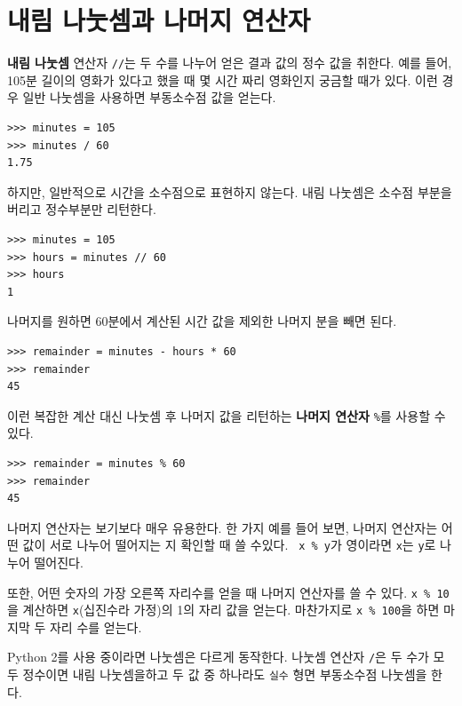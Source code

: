 \documentclass[10pt]{book}
\begin{document}
\section{내림 나눗셈과 나머지 연산자}

{\bf 내림 나눗셈} 연산자 \verb"//"는 두 수를 나누어 얻은 결과 값의 정수
값을 취한다.  예를 들어, 105분 길이의 영화가 있다고 했을 때 몇 시간
짜리 영화인지 궁금할 때가 있다.  이런 경우 일반 나눗셈을 사용하면
부동소수점 값을 얻는다.

\begin{verbatim}
>>> minutes = 105
>>> minutes / 60
1.75
\end{verbatim}

하지만, 일반적으로 시간을 소수점으로 표현하지 않는다. 내림 나눗셈은
소수점 부분을 버리고 정수부분만 리턴한다.


\begin{verbatim}
>>> minutes = 105
>>> hours = minutes // 60
>>> hours
1
\end{verbatim}

나머지를 원하면 60분에서 계산된 시간 값을 제외한 나머지 분을 빼면 된다. 

\begin{verbatim}
>>> remainder = minutes - hours * 60
>>> remainder
45
\end{verbatim}


이런 복잡한 계산 대신 나눗셈 후 나머지 값을 리턴하는 {\bf 나머지
  연산자} \verb"%"를 사용할 수 있다.

\begin{verbatim}
>>> remainder = minutes % 60
>>> remainder
45
\end{verbatim}
%
나머지 연산자는 보기보다 매우 유용한다.  한 가지 예를 들어 보면, 나머지
연산자는 어떤 값이 서로 나누어 떨어지는 지 확인할 때 쓸 수있다.  {\tt
  x \% y}가 영이라면 {\tt x}는 {\tt y}로 나누어 떨어진다.

또한, 어떤 숫자의 가장 오른쪽 자리수를 얻을 때 나머지 연산자를 쓸 수
있다.  {\tt x \% 10}을 계산하면 {\tt x}(십진수라 가정)의 1의 자리 값을
얻는다.  마찬가지로 {\tt x \% 100}을 하면 마지막 두 자리 수를 얻는다.

Python 2를 사용 중이라면 나눗셈은 다르게 동작한다.  나눗셈 연산자
\verb"/"은 두 수가 모두 정수이면 내림 나눗셈을하고 두 값 중 하나라도
{\tt 실수} 형면 부동소수점 나눗셈을 한다.
\end{document}
